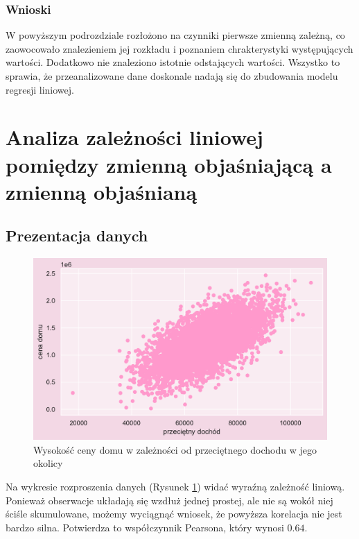 \documentclass{article}
\begin{document}
\subsubsection{Wnioski}
W powyższym podrozdziale rozłożono na czynniki pierwsze zmienną zależną, co zaowocowało znalezieniem jej rozkładu i poznaniem chrakterystyki występujących wartości. Dodatkowo nie znaleziono istotnie odstających wartości. Wszystko to sprawia, że przeanalizowane dane doskonale nadają się do zbudowania modelu regresji liniowej.
\section{Analiza zależności liniowej pomiędzy zmienną objaśniającą a zmienną objaśnianą}

\subsection{Prezentacja danych}

    \begin{figure}[H]
	\begin{center}
		\includegraphics[scale=0.68]{images/scatter1.pdf}
		\caption{Wysokość ceny domu w zależności od przeciętnego dochodu w jego okolicy}
		\label{scatterxy}
	\end{center}
	\end{figure}

Na wykresie rozproszenia danych (Rysunek \ref{scatterxy}) widać wyraźną zależność liniową. Ponieważ obserwacje układają się wzdłuż jednej prostej, ale nie są wokół niej ściśle skumulowane, możemy wyciągnąć wniosek, że powyższa korelacja nie jest bardzo silna. Potwierdza to współczynnik Pearsona, który wynosi $0.64$.
 
\end{document}
